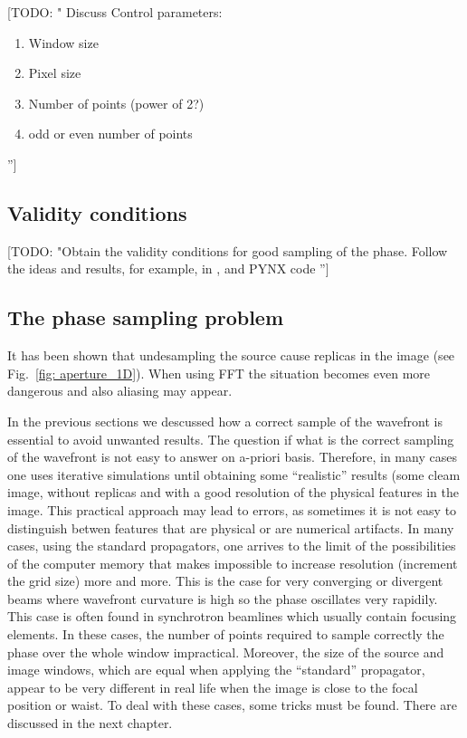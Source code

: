 \documentclass{iucr}              %
\newcommand{\todo}[1]{{\color{red}[TODO: "#1'']}}
\begin{document}
\todo{ Discuss Control parameters: 
\begin{enumerate}
\item Window size
\item Pixel size
\item Number of points (power of 2?)
\item odd or even number of points
\end{enumerate}
}


\subsection{Validity conditions}

\todo{Obtain the validity conditions for good sampling of the phase. Follow the ideas and results, for example, in \cite{schmidt}, \cite{pirro} and PYNX code }  


\subsection{The phase sampling problem}


It has been shown that undesampling the source cause replicas in the image (see Fig.~\ref{fig: aperture_1D}). When using FFT the situation becomes even more dangerous and also aliasing may appear. 

In the previous sections we descussed how a correct sample of the wavefront is essential to avoid unwanted results. The question if what is the correct sampling of the wavefront is not easy to answer on a-priori basis. Therefore, in many cases one uses iterative simulations until obtaining some ``realistic'' results (some cleam image, without replicas and with a good resolution of the physical features in the image. This practical approach may lead to errors, as sometimes it is not easy to distinguish betwen features that are physical or are numerical artifacts. In many cases, using the standard propagators, one arrives to the limit of the possibilities of the computer memory that makes impossible to increase resolution (increment the grid size) more and more. This is the case for very converging or divergent beams where wavefront curvature is high so the phase oscillates very rapidily. This case is often found in synchrotron beamlines which usually contain focusing elements. In these cases, the number of points required to sample correctly the phase over the whole window impractical. Moreover, the size of the source and image windows, which are equal when applying the ``standard'' propagator, appear to be very different in real life when the image is close to the focal position or waist. To deal with these cases, some tricks must be found. There are discussed in the next chapter.
\end{document}
